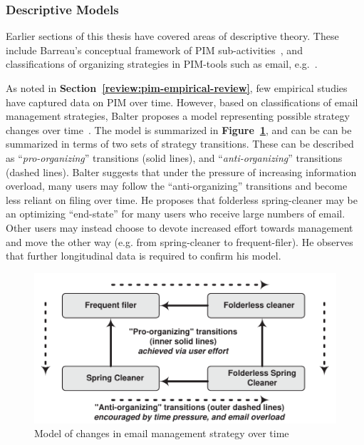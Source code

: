 \subsubsection{Descriptive Models}
\label{review:theory-pimmodels:descriptive}

Earlier sections of this thesis have covered areas of descriptive theory.  These include Barreau's conceptual framework of PIM sub-activities~\citep{barreau:95}, and classifications of organizing strategies in PIM-tools such as email, e.g.~\citep{Whittaker-email:96}.  %

As noted in \textbf{Section~\ref{review:pim-empirical-review}}, few empirical studies have captured data on PIM over time.  However, based on classifications of email management strategies, Balter proposes a model representing possible strategy changes over time~\citep{ob:97}.  The model is summarized in \textbf{Figure~\ref{fig:ch2_balter_model}}, and can be can be summarized in terms of two sets of strategy transitions.  These can be described as ``\textit{pro-organizing}'' transitions (solid lines), and ``\textit{anti-organizing}'' transitions (dashed lines).  Balter suggests that under the pressure of increasing information overload, many users may follow the ``anti-organizing'' transitions and become less reliant on filing over time. He proposes that folderless spring-cleaner may be an optimizing ``end-state'' for many users who receive large numbers of email. Other users may instead choose to devote increased effort towards management and move the other way (e.g. from spring-cleaner to frequent-filer). He observes that further longitudinal data is required to confirm his model. 

\begin{figure}[hbtp]
	\begin{center}
		\leavevmode	\includegraphics[width=.7\textwidth]{pictures/research_review/Ch2-BalterLongitudinalModel.pdf}
	\end{center}
	\caption{Model of changes in email management strategy over time~\citep{ob:97}}
	\label{fig:ch2_balter_model}
\end{figure}


